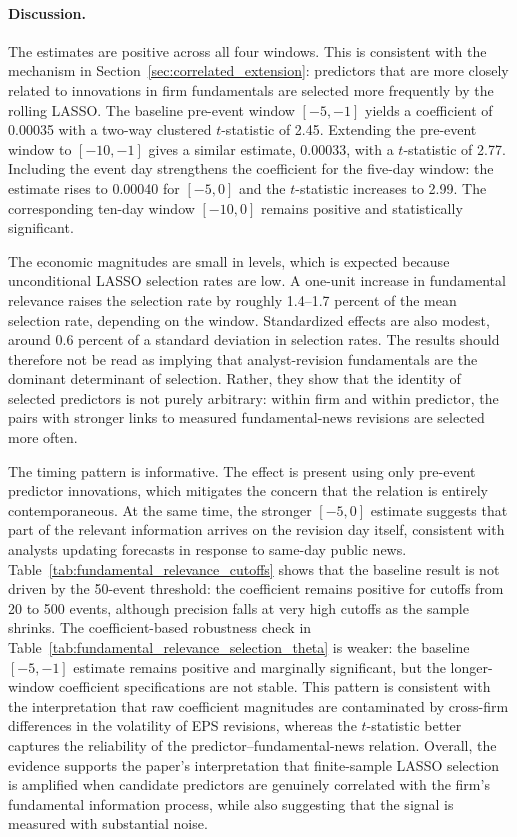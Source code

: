 \paragraph{Discussion.}

The estimates are positive across all four windows. This is consistent with the mechanism in Section~\ref{sec:correlated_extension}: predictors that are more closely related to innovations in firm fundamentals are selected more frequently by the rolling LASSO. The baseline pre-event window $[-5,-1]$ yields a coefficient of 0.00035 with a two-way clustered $t$-statistic of 2.45. Extending the pre-event window to $[-10,-1]$ gives a similar estimate, 0.00033, with a $t$-statistic of 2.77. Including the event day strengthens the coefficient for the five-day window: the estimate rises to 0.00040 for $[-5,0]$ and the $t$-statistic increases to 2.99. The corresponding ten-day window $[-10,0]$ remains positive and statistically significant.

The economic magnitudes are small in levels, which is expected because unconditional LASSO selection rates are low. A one-unit increase in fundamental relevance raises the selection rate by roughly 1.4--1.7 percent of the mean selection rate, depending on the window. Standardized effects are also modest, around 0.6 percent of a standard deviation in selection rates. The results should therefore not be read as implying that analyst-revision fundamentals are the dominant determinant of selection. Rather, they show that the identity of selected predictors is not purely arbitrary: within firm and within predictor, the pairs with stronger links to measured fundamental-news revisions are selected more often.

The timing pattern is informative. The effect is present using only pre-event predictor innovations, which mitigates the concern that the relation is entirely contemporaneous. At the same time, the stronger $[-5,0]$ estimate suggests that part of the relevant information arrives on the revision day itself, consistent with analysts updating forecasts in response to same-day public news. Table~\ref{tab:fundamental_relevance_cutoffs} shows that the baseline result is not driven by the 50-event threshold: the coefficient remains positive for cutoffs from 20 to 500 events, although precision falls at very high cutoffs as the sample shrinks. The coefficient-based robustness check in Table~\ref{tab:fundamental_relevance_selection_theta} is weaker: the baseline $[-5,-1]$ estimate remains positive and marginally significant, but the longer-window coefficient specifications are not stable. This pattern is consistent with the interpretation that raw coefficient magnitudes are contaminated by cross-firm differences in the volatility of EPS revisions, whereas the $t$-statistic better captures the reliability of the predictor--fundamental-news relation. Overall, the evidence supports the paper's interpretation that finite-sample LASSO selection is amplified when candidate predictors are genuinely correlated with the firm's fundamental information process, while also suggesting that the signal is measured with substantial noise.
